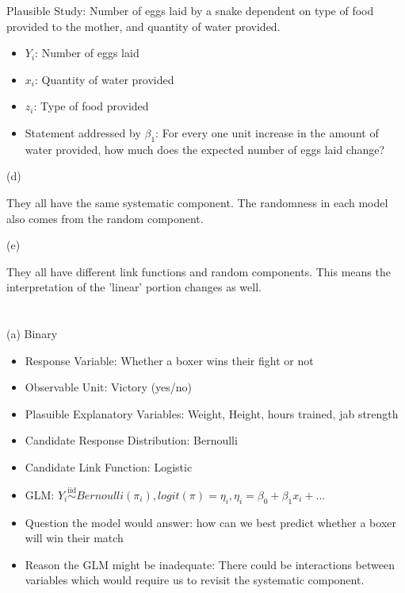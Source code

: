 \documentclass{article}
\newcommand{\iiddist}{\overset{\mathrm{iid}}{\sim}}
\begin{document}
Plausible Study: Number of eggs laid by a snake dependent on type of food provided to the mother, and quantity of water provided. 

\begin{itemize}
    \item $Y_i$: Number of eggs laid
    \item $x_i$: Quantity of water provided
    \item $z_i$: Type of food provided
    \item Statement addressed by $\beta_1$: For every one unit increase in the amount of water provided, how much does the expected number of eggs laid change?
\end{itemize}

(d)

They all have the same systematic component. The randomness in each model also comes from the random component. 

(e)

They all have different link functions and random components. This means the interpretation of the 'linear' portion changes as well. 


\section{}

(a) Binary

\begin{itemize}
    \item Response Variable: Whether a boxer wins their fight or not
    \item Observable Unit: Victory (yes/no)
    \item Plasuible Explanatory Variables: Weight, Height, hours trained, jab strength
    \item Candidate Response Distribution: Bernoulli
    \item Candidate Link Function: Logistic
    \item GLM: $Y_i \iiddist Bernoulli(\pi_i), logit(\pi) = \eta_i, \eta_i = \beta_0 + \beta_1 x_i + ...$
    \item Question the model would answer: how can we best predict whether a boxer will win their match
    \item Reason the GLM might be inadequate: There could be interactions between variables which would require us to revisit the systematic component.
\end{itemize}
\end{document}

